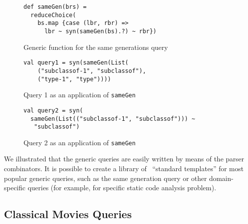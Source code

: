 
\begin{figure}[h]
\begin{lstlisting}
def sameGen(brs) =
  reduceChoice(
    bs.map {case (lbr, rbr) =>
      lbr ~ syn(sameGen(bs).?) ~ rbr})
\end{lstlisting}
\caption{Generic function for the same generations query}
\label{fig:gen}
\end{figure}


\begin{figure}[h]
\begin{lstlisting}
val query1 = syn(sameGen(List(
    ("subclassof-1", "subclassof"),
    ("type-1", "type"))))
\end{lstlisting}
\caption{Query 1 as an application of \lstinline{sameGen}}
\label{fig:query1Gen}
\end{figure}


\begin{figure}[h]
\begin{lstlisting}
val query2 = syn(
  sameGen(List(("subclassof-1", "subclassof"))) ~
   "subclassof")
\end{lstlisting}
\caption{Query 2 as an application of \lstinline{sameGen}}
\label{fig:query2Gen}
\end{figure}


We illustrated that the generic queries are easily written by means of the parser combinators.
It is possible to create a library of \ ``standard templates'' for most popular generic queries, such as the same generation query or other domain-specific queries (for example, for specific static code analysis problem).


\subsection{Classical Movies Queries}

